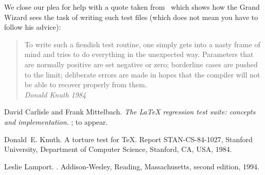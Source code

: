 \documentclass{ltugboat}
\begin{document}
We close our plea for help with a quote taken
from~\cite{Knuth:1984:TTT} which shows how the Grand Wizard sees the
task of writing such test files (which does not mean you have to follow
his advice):
\begin{quote}
\setlength{}
To write such a fiendish test routine, one simply gets into a nasty frame
of mind and tries to do everything in the unexpected way. Parameters
that are normally positive are set negative or zero; borderline cases
are pushed to the limit; deliberate errors are made in hopes that the
compiler will not be able to recover properly from them.\\
\mbox{}\hfill\slshape Donald Knuth 1984
\end{quote}




\begin{thebibliography}{1}
David Carlisle and Frank Mittelbach.
\newblock \emph{The \LaTeX{} regression test suite: concepts and
implementation}.
\newblock \TUB{}; to appear.

Donald~E. Knuth.
\newblock A torture test for {\TeX}.
\newblock Report STAN-CS-84-1027, Stanford University, Department of Computer
  Science, Stanford, CA, USA, 1984.

Leslie Lamport.
.
\newblock Addison-Wesley, Reading, Massachusetts, second edition, 1994.

\end{thebibliography}

\makesignature
\end{document}
